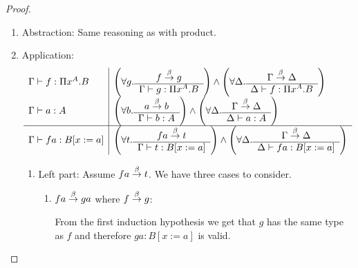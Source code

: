 \begin{theorem}
{\begin{proof}
\begin{enumerate}
\begin{enumerate}
\begin{enumerate}
                    In both cases we can derive from the induction hypotheses
                        either $\Gamma \vdash C: s_1$ or $\Gamma,x^A \vdash D:
                        s_2$. Therefore $\Gamma \vdash \Pi x^C. B: s_2$ or $\Gamma
                        \vdash \Pi x^A.D: s_2$ is valid trivially.

                    \item Right part: Assume $\Gamma \reduce \Delta$. From the
                        first induction hypothesis we get $\Delta \vdash A:
                        s_1$. From the second induction hypothesis we get
                        $\Delta, x^A \vdash B: s_2$ where we use $\Delta' =
                        \Delta, x^A$. These facts imply $\Delta
                        \vdash \Pi x^A. B : s_2$.
                \end{enumerate}

                \item Abstraction: Same reasoning as with product.

                \item Application:
                $$
                \begin{array}{l|l}
                    \Gamma \vdash f: \Pi x^A. B
                    &
                    \left( \forall g. \begin{array}{c} f \stackrel{\beta}{\to} g \\ \hline \Gamma \vdash g: \Pi x^A. B\end{array} \right)
                    \land
                    \left( \forall \Delta. \begin{array}{c} \Gamma \stackrel{\beta}{\to} \Delta \\ \hline \Delta \vdash f: \Pi x^A.B\end{array} \right)
                    \\
                    \Gamma \vdash a: A
                    &
                    \left( \forall b. \begin{array}{c} a \stackrel{\beta}{\to} b \\ \hline \Gamma \vdash b: A\end{array} \right)
                    \land
                    \left( \forall \Delta. \begin{array}{c} \Gamma \stackrel{\beta}{\to} \Delta \\ \hline \Delta \vdash a: A\end{array} \right)
                    \\
                    \hline
                    \Gamma \vdash f a: B[x:=a]
                    &
                    \left( \forall t. \begin{array}{c} f a \stackrel{\beta}{\to} t \\ \hline \Gamma \vdash t: B[x:=a]\end{array} \right)
                    \land
                    \left( \forall \Delta. \begin{array}{c} \Gamma \stackrel{\beta}{\to} \Delta \\ \hline \Delta \vdash f a: B[x:=a]\end{array} \right)
                \end{array}
                $$
                \begin{enumerate}
                    \item Left part: Assume $f a \stackrel{\beta}{\to} t$. We have three cases
                        to consider.
                    \begin{enumerate}
                        \item $f a \stackrel{\beta}{\to} g a$ where $f \stackrel{\beta}{\to} g$:

                            From the first induction hypothesis we get that $g$
                            has the same type as $f$ and therefore $g a:
                            B[x:=a]$ is valid.


\end{enumerate}
\end{enumerate}
\end{enumerate}
\end{enumerate}
\end{proof}}
\end{theorem}
